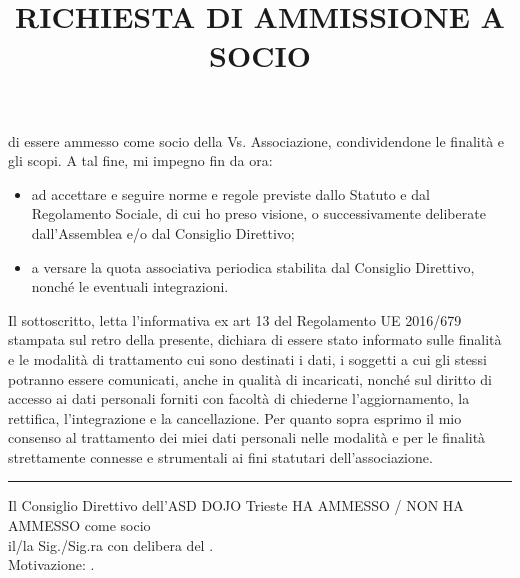 \documentclass[
	headerstyle = TitleDojoFijlkam
]{djtsmod}
\title{RICHIESTA DI AMMISSIONE A SOCIO}
\begin{document}
	\maketitle
	
	
	\basedata
	
	di essere ammesso come socio della Vs. Associazione, condividendone le finalità e gli scopi. A tal fine, mi impegno fin da ora:
	\begin{itemize}
		\item ad accettare e seguire norme e regole previste dallo Statuto e dal Regolamento Sociale, di cui ho preso visione, o successivamente deliberate dall'Assemblea e/o dal Consiglio Direttivo;
		\item a versare la quota associativa periodica stabilita dal Consiglio Direttivo, nonché le eventuali integrazioni.
	\end{itemize}
	\vspace{0.1in}
	
	\vspace{0.3in}
	Il sottoscritto, letta l'informativa ex art 13 del Regolamento UE 2016/679 stampata sul retro della presente, dichiara di essere stato informato sulle finalità e le modalità di trattamento cui sono destinati i dati, i soggetti a cui gli stessi potranno essere comunicati, anche in qualità di incaricati, nonché sul diritto di accesso ai dati personali forniti con facoltà di chiederne l'aggiornamento, la rettifica, l'integrazione e la cancellazione.
	Per quanto sopra esprimo il mio consenso al trattamento dei miei dati personali nelle modalità e per le finalità strettamente connesse e strumentali ai fini statutari dell'associazione.
	\vspace{0.1in}
	
	\vspace{0.3in}
	\hrule
	\vspace{0.1in}
	
	Il Consiglio Direttivo dell'ASD DOJO Trieste HA AMMESSO / NON HA AMMESSO come socio\\ il/la Sig./Sig.ra \fieldfill\; con delibera del \field{2in}. \\
	Motivazione: \fieldfill.
	
	\vspace{0.2in}
	
\end{document}

